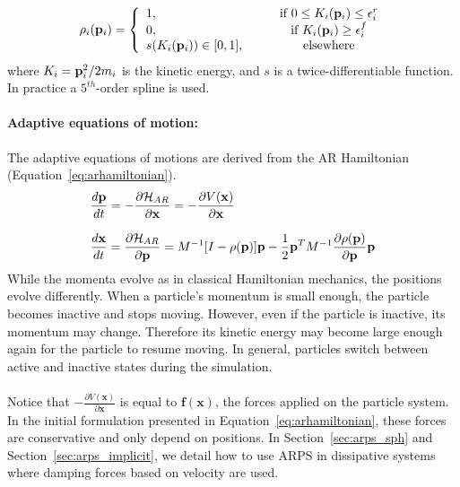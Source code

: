 \begin{equation}
    \label{eq:restrainingfunction}
    \rho_{i}(\mathbf{p}_{i}) =
    \displaystyle\left\lbrace
    \begin{array}{lccc}
        1, & & & \textrm{if } 0 \leq K_{i}(\mathbf{p}_{i}) \leq \epsilon_{i}^{r} \\
        0, & & & \textrm{if } K_{i}(\mathbf{p}_{i}) \geq \epsilon_{i}^{f} \\
        s(K_{i}(\mathbf{p}_{i})) \in [0, 1], & & & \textrm{elsewhere} \\
    \end{array}
    \right.
\end{equation}
where $K_i=\mathbf{p}_{i}^2/2m_{i}$ is the kinetic energy, and
$s$ is a twice-differentiable function. In practice a $5^{th}$-order spline is used.
\paragraph*{Adaptive equations of motion:}
The adaptive equations of motions are derived from the AR Hamiltonian (Equation~\eqref{eq:arhamiltonian}).
\begin{equation}
   \label{eq:armotionequation}
    \displaystyle
    \begin{array}{l}
        \displaystyle \frac{d\mathbf{p}}{dt} =
        -\frac{\partial \mathcal{H}_{AR}}{\partial \mathbf{x}} = -\frac{\partial V(\mathbf{x})}{\partial \mathbf{x}}\\ \\
        \displaystyle \frac{d\mathbf{x}}{dt} =
       \frac{\partial \mathcal{H}_{AR}}{\partial \mathbf{p}} = M^{-1}[I - \rho(\mathbf{p})] \mathbf{p}
        - \frac{1}{2}\mathbf{p}^{T}M^{-1}\frac{\partial \rho(\mathbf{p})}{\partial \mathbf{p}}\mathbf{p}\\
    \end{array}
\end{equation}
While the momenta evolve as in classical Hamiltonian mechanics, the positions evolve differently.
When a particle's momentum is small enough, the particle becomes inactive and stops moving.
However, even if the particle is inactive, its momentum may change.
Therefore its kinetic energy may become large enough again for the particle to resume moving.
In general, particles switch between active and inactive states during the simulation.
\paragraph*{}
Notice that $\displaystyle -\frac{\partial V(\mathbf{x})}{\partial \mathbf{x}}$ is equal to $\mathbf{f}(\mathbf{x})$, the forces applied on the particle system. In the initial formulation presented in Equation~\ref{eq:arhamiltonian}, these forces are conservative and only depend on positions. In Section~\ref{sec:arps_sph} and Section~\ref{sec:arps_implicit}, we detail how to use ARPS in dissipative systems where damping forces based on velocity are used.
